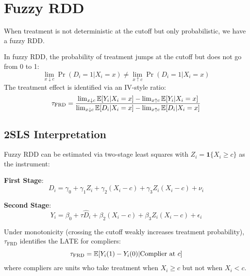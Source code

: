 \section{Fuzzy RDD}
\label{sec:rdd_fuzzy}

When treatment is not deterministic at the cutoff but only probabilistic, we have a fuzzy RDD.

\begin{definition}
\label{def:fuzzy_rdd}
In fuzzy RDD, the probability of treatment jumps at the cutoff but does not go from 0 to 1:
\begin{equation}
    \lim_{x \downarrow c} \Pr(D_i = 1 | X_i = x) \neq \lim_{x \uparrow c} \Pr(D_i = 1 | X_i = x)
\end{equation}
The treatment effect is identified via an IV-style ratio:
\begin{equation}
    \tau_{\text{FRD}} = \frac{\lim_{x \downarrow c} \mathbb{E}[Y_i | X_i = x] - \lim_{x \uparrow c} \mathbb{E}[Y_i | X_i = x]}{\lim_{x \downarrow c} \mathbb{E}[D_i | X_i = x] - \lim_{x \uparrow c} \mathbb{E}[D_i | X_i = x]}
    \label{eq:rdd_fuzzy_tau}
\end{equation}
\end{definition}

\subsection{2SLS Interpretation}

Fuzzy RDD can be estimated via two-stage least squares with $Z_i = \mathbf{1}\{X_i \geq c\}$ as the instrument:

\textbf{First Stage}:
\begin{equation}
    D_i = \gamma_0 + \gamma_1 Z_i + \gamma_2 (X_i - c) + \gamma_3 Z_i (X_i - c) + \nu_i
\end{equation}

\textbf{Second Stage}:
\begin{equation}
    Y_i = \beta_0 + \tau \hat{D}_i + \beta_2 (X_i - c) + \beta_3 Z_i (X_i - c) + \epsilon_i
\end{equation}

\begin{theorem}
\label{thm:fuzzy_rdd_late}
Under monotonicity (crossing the cutoff weakly increases treatment probability), $\tau_{\text{FRD}}$ identifies the LATE for compliers:
\begin{equation}
    \tau_{\text{FRD}} = \mathbb{E}[Y_i(1) - Y_i(0) | \text{Complier at } c]
\end{equation}
where compliers are units who take treatment when $X_i \geq c$ but not when $X_i < c$.
\end{theorem}

